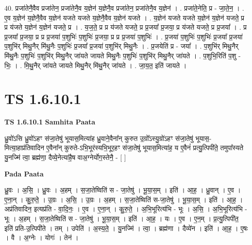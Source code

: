 \documentclass[17pt]{extarticle}
\begin{document}
40. प्रजा॑तेनै॒वैव प्रजा॑तेन॒ प्रजा॑तेनै॒व य॒ज्ञेन॑ य॒ज्ञेनै॒व प्रजा॑तेन॒ प्रजा॑तेनै॒व य॒ज्ञेन॑ । . प्रजा॑ते॒नेति॒ प्र - जा॒ते॒न॒ । . ए॒व य॒ज्ञेन॑ य॒ज्ञेनै॒वैव य॒ज्ञेन॑ यजते यजते य॒ज्ञेनै॒वैव य॒ज्ञेन॑ यजते । . य॒ज्ञेन॑ यजते यजते य॒ज्ञेन॑ य॒ज्ञेन॑ यजते॒ प्र प्र य॑जते य॒ज्ञेन॑ य॒ज्ञेन॑ यजते॒ प्र । . य॒ज॒ते॒ प्र प्र य॑जते यजते॒ प्र प्र॒जया᳚ प्र॒जया॒ प्र य॑जते यजते॒ प्र प्र॒जया᳚ । . प्र प्र॒जया᳚ प्र॒जया॒ प्र प्र प्र॒जया॑ प॒शुभिः॑ प॒शुभिः॑ प्र॒जया॒ प्र प्र प्र॒जया॑ प॒शुभिः॑ । . प्र॒जया॑ प॒शुभिः॑ प॒शुभिः॑ प्र॒जया᳚ प्र॒जया॑ प॒शुभि॑र् मिथु॒नैर् मि॑थु॒नैः प॒शुभिः॑ प्र॒जया᳚ प्र॒जया॑ प॒शुभि॑र् मिथु॒नैः । . प्र॒जयेति॑ प्र - जया᳚ । . प॒शुभि॑र् मिथु॒नैर् मि॑थु॒नैः प॒शुभिः॑ प॒शुभि॑र् मिथु॒नैर् जा॑यते जायते मिथु॒नैः प॒शुभिः॑ प॒शुभि॑र् मिथु॒नैर् जा॑यते । . प॒शुभि॒रिति॑ प॒शु - भिः॒ । . मि॒थु॒नैर् जा॑यते जायते मिथु॒नैर् मि॑थु॒नैर् जा॑यते । . जा॒य॒त॒ इति॑ जायते । \newline
\pagebreak
{}
\section*{ TS 1.6.10.1 }

\textbf{TS 1.6.10.1 } \newline
\textbf{Samhita Paata} \newline

ध्रु॒वो॑ऽसि ध्रु॒वो॑ऽहꣳ स॑जा॒तेषु॑ भूयास॒मित्या॑ह ध्रु॒वाने॒वैना᳚न् कुरुत उ॒ग्रो᳚ऽस्यु॒ग्रो॑ऽहꣳ स॑जा॒तेषु॑ भूयास॒-मित्या॒हाप्र॑तिवादिन ए॒वैना᳚न् कुरुते-ऽभि॒भूर॑स्यभि॒भूर॒हꣳ स॑जा॒तेषु॑ भूयास॒मित्या॑ह॒ य ए॒वैनं॑ प्रत्यु॒त्पिपी॑ते॒ तमुपा᳚स्यते यु॒नज्मि॑ त्वा॒ ब्रह्म॑णा॒ दैव्ये॒नेत्या॑है॒ष वाअ॒ग्नेर्योग॒स्तेनै॒ - [ ] \newline

\textbf{Pada Paata} \newline

ध्रु॒वः । अ॒सि॒ । ध्रु॒वः । अ॒हम् । स॒जा॒तेष्विति॑ स - जा॒तेषु॑ । भू॒या॒स॒म् । इति॑ । आ॒ह॒ । ध्रु॒वान् । ए॒व । ए॒ना॒न् । कु॒रु॒ते॒ । उ॒ग्रः । अ॒सि॒ । उ॒ग्रः । अ॒हम् । स॒जा॒तेष्विति॑ स-जा॒तेषु॑ । भू॒या॒स॒म् । इति॑ । आ॒ह॒ । अप्र॑तिवादिन॒ इत्यप्र॑ति - वा॒दि॒नः॒ । ए॒व । ए॒ना॒न् । कु॒रु॒ते॒ । अ॒भि॒भूरित्य॑भि - भूः । अ॒सि॒ । अ॒भि॒भूरित्य॑भि - भूः । अ॒हम् । स॒जा॒तेष्विति॑ स - जा॒तेषु॑ । भू॒या॒स॒म् । इति॑ । आ॒ह॒ । यः । ए॒व । ए॒न॒म् । प्र॒त्यु॒त्पिपी॑त॒ इति॑ प्रति-उ॒त्पिपी॑ते । तम् । उपेति॑ । अ॒स्य॒ते॒ । यु॒नज्मि॑ । त्वा॒ । ब्रह्म॑णा । दैव्ये॑न । इति॑ । आ॒ह॒ । ए॒षः । वै । अ॒ग्नेः । योगः॑ । तेन॑ ।  \newline
\end{document}
